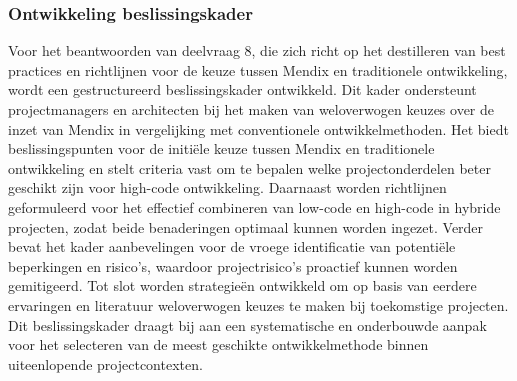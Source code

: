 \subsubsection{Ontwikkeling beslissingskader}
Voor het beantwoorden van deelvraag 8, die zich richt op het destilleren van best practices en richtlijnen voor de keuze tussen Mendix en traditionele ontwikkeling, wordt een gestructureerd beslissingskader ontwikkeld. Dit kader ondersteunt projectmanagers en architecten bij het maken van weloverwogen keuzes over de inzet van Mendix in vergelijking met conventionele ontwikkelmethoden. Het biedt beslissingspunten voor de initiële keuze tussen Mendix en traditionele ontwikkeling en stelt criteria vast om te bepalen welke projectonderdelen beter geschikt zijn voor high-code ontwikkeling. Daarnaast worden richtlijnen geformuleerd voor het effectief combineren van low-code en high-code in hybride projecten, zodat beide benaderingen optimaal kunnen worden ingezet. Verder bevat het kader aanbevelingen voor de vroege identificatie van potentiële beperkingen en risico’s, waardoor projectrisico’s proactief kunnen worden gemitigeerd. Tot slot worden strategieën ontwikkeld om op basis van eerdere ervaringen en literatuur weloverwogen keuzes te maken bij toekomstige projecten. Dit beslissingskader draagt bij aan een systematische en onderbouwde aanpak voor het selecteren van de meest geschikte ontwikkelmethode binnen uiteenlopende projectcontexten.


